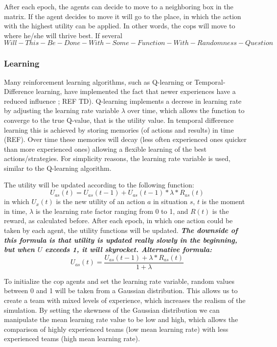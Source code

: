 After each epoch, the agents can decide to move to a neighboring box in the matrix. If the agent decides to move it will go to the place, in which the action with the highest utility can be applied. In other words, the cops will move to where he/she will thrive best. If several 
$$ Will-This-Be-Done-With-Some-Function-With-Randomness-Question$$

\subsubsection{Learning}
Many reinforcement learning algorithms, such as Q-learning or Temporal-Difference learning, have implemented the fact that newer experiences have a reduced influence  \citep*{watkins1992q}; REF TD). Q-learning implements a decrese in learning rate by adjusting the learning rate variable $\lambda$ over time, which allows the function to converge to the true Q-value, that is the utility value. In temporal difference learning this is achieved by storing memories (of actions and results) in time (REF). Over time these memories will decay (less often experienced ones quicker than more experienced ones) allowing a flexible learning of the best actions/strategies. For simplicity reasons, the learning rate variable is used, similar to the Q-learning algorithm. 

The utility will be updated according to the following function:
$$ U_{as}(t) = U_{as}(t-1) + U_{as}(t-1) * \lambda * R_{as}(t) $$
in which $U_x(t)$ is the new utility of an action $a$ in situation $s$, $t$ is the moment in time, $\lambda$ is the learning rate factor ranging from 0 to 1, and $R(t)$ is the reward, as calculated before. After each epoch, in which one action could be taken by each agent, the utility functions will be updated. \textbf{\emph{The downside of this formula is that utility is updated really slowly in the beginning, but when $U$ exceeds 1, it will skyrocket. Alternative formula:}}
$$ U_{as}(t) = \frac{U_{as}(t-1) + \lambda * R_{as}(t)}{1+\lambda} $$

To initialize the cop agents and set the learning rate variable, random values between 0 and 1 will be taken from a Gaussian distribution. This allows us to create a team with mixed levels of experience, which increases the realism of the simulation. By setting the skewness of the Gaussian distribution we can manipulate the mean learning rate value to be low and high, which allows the comparison of highly experienced teams (low mean learning rate) with less experienced teams (high mean learning rate). 

